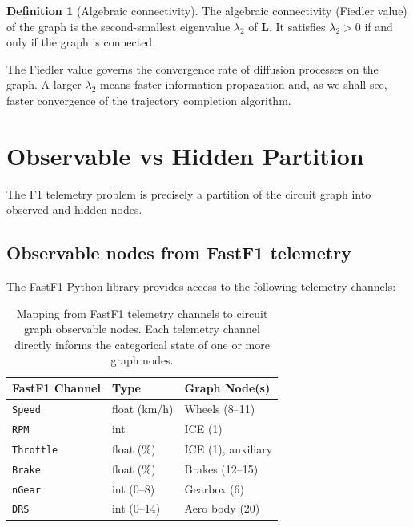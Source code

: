 \documentclass[twocolumn,10pt,a4paper]{article}
\theoremstyle{definition}
\newtheorem{definition}[theorem]{Definition}
\theoremstyle{remark}
\newcommand{\mat}[1]{\mathbf{#1}}
\begin{document}
\begin{definition}[Algebraic connectivity]\label{def:algebraic_connectivity}
The algebraic connectivity (Fiedler value) of the graph is the second-smallest eigenvalue $\lambda_2$ of $\mat{L}$. It satisfies $\lambda_2 > 0$ if and only if the graph is connected.
\end{definition}

The Fiedler value governs the convergence rate of diffusion processes on the graph. A larger $\lambda_2$ means faster information propagation and, as we shall see, faster convergence of the trajectory completion algorithm.


\section{Observable vs Hidden Partition}\label{sec:partition}

The F1 telemetry problem is precisely a partition of the circuit graph into observed and hidden nodes.

\subsection{Observable nodes from FastF1 telemetry}

The FastF1 Python library \citep{Theelke2023} provides access to the following telemetry channels:

\begin{table}[!htbp]
\centering
\caption{Mapping from FastF1 telemetry channels to circuit graph observable nodes. Each telemetry channel directly informs the categorical state of one or more graph nodes.}
\label{tab:observable}
\begin{tabular}{@{}lll@{}}
\toprule
FastF1 Channel & Type & Graph Node(s) \\
\midrule
\texttt{Speed}    & float (km/h)  & Wheels (8--11) \\
\texttt{RPM}      & int           & ICE (1) \\
\texttt{Throttle} & float (\%)    & ICE (1), auxiliary \\
\texttt{Brake}    & float (\%)    & Brakes (12--15) \\
\texttt{nGear}    & int (0--8)    & Gearbox (6) \\
\texttt{DRS}      & int (0--14)   & Aero body (20) \\
\bottomrule
\end{tabular}
\end{table}
\end{document}
